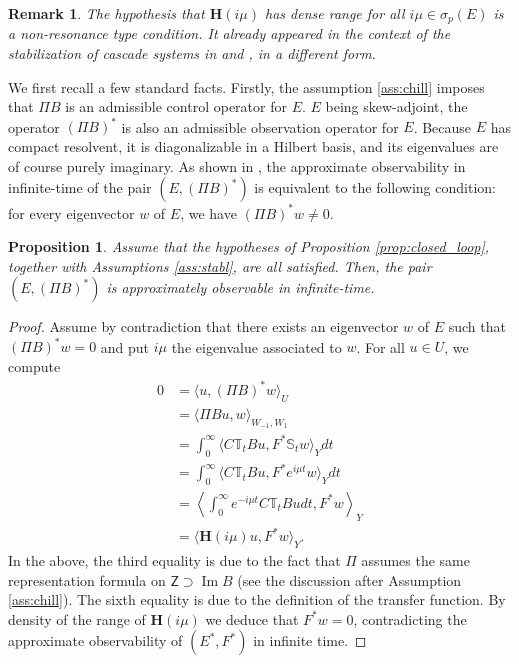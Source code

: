 \documentclass[10pt]{article}
\newcommand{\opIm}{\operatorname{Im}}
\newtheorem{Proposition}[Theorem]{Proposition}
\newtheorem{Remark}[Theorem]{Remark}
\begin{document}
\begin{Remark}
The hypothesis that $\mathbf{H}(i\mu)$ has dense range for all $i \mu \in \sigma_p(E)$ is a non-resonance type condition. It already appeared in the context of the stabilization of cascade systems in \cite[Proposition 1]{marx2021forwarding} and \cite[Assumption 2.2]{paunonen2015controller}, in a different form.  
\end{Remark}
We first recall a few standard facts. Firstly, the assumption \ref{ass:chill} imposes that $\Pi B$ is an admissible control operator for $E$. $E$ being skew-adjoint, the operator $(\Pi B)^*$ is also an admissible observation operator for $E$. Because $E$ has compact resolvent, it is diagonalizable in a Hilbert basis, and its eigenvalues are of course purely imaginary. As shown in \cite[Proposition 6.9.1]{tucsnak2009observation}, the approximate observability in infinite-time of the pair $(E,(\Pi B)^*)$ is equivalent to the following condition: for every eigenvector $w$ of $E$, we have $(\Pi B)^*w \neq 0$. 
\begin{Proposition} \label{prop:non-resonance}
Assume that the hypotheses of Proposition \ref{prop:closed_loop}, together with Assumptions \ref{ass:stabl}, are all satisfied. Then, the pair $(E,(\Pi B)^*)$ is approximately observable in infinite-time.
\end{Proposition}

\begin{proof}
Assume by contradiction that there exists an eigenvector $w$ of $E$ such that $(\Pi B)^*w = 0$ and put $i \mu$ the eigenvalue associated to $w$. For all $u \in U$, we compute
\begin{align*}
    0 &= \langle u, (\Pi B)^* w  \rangle_U \\
    &= \langle \Pi B u , w \rangle_{W_{-1},W_1} \\
    &= \int_0^\infty \langle C \mathbb{T}_t B u , F^* \mathbb{S}_t w \rangle_Y dt  \\
    &= \int_0^\infty \langle C \mathbb{T}_t B u , F^* e^{i \mu t} w \rangle_Y dt \\
    &= \left\langle \int_0^\infty e^{-i\mu t} C \mathbb{T}_t B u dt , F^*w \right\rangle_Y \\
    &=  \langle \mathbf{H}(i\mu)u,F^*w \rangle_Y .
\end{align*}
In the above, the third equality is due to the fact that $\Pi$ assumes the same representation formula on $\mathsf{Z} \supset \opIm B$ (see the discussion after Assumption \ref{ass:chill}). The sixth equality is due to the definition of the transfer function. By density of the range of $\mathbf{H}(i\mu)$ we deduce that $F^*w = 0$, contradicting the approximate observability of $(E^*,F^*)$ in infinite time. 
\end{proof}
\end{document}
